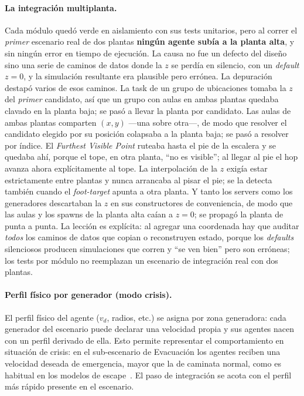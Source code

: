 \documentclass[11pt,a4paper]{article}
\begin{document}
\paragraph{La integración multiplanta.}
Cada módulo quedó verde en aislamiento con sus tests unitarios, pero al correr el \emph{primer}
escenario real de dos plantas \textbf{ningún agente subía a la planta alta}, y sin ningún error
en tiempo de ejecución. La causa no fue un defecto del diseño sino una serie de caminos de datos
donde la $z$ se perdía en silencio, con un \emph{default} $z=0$, y la simulación resultante era
plausible pero errónea. La depuración destapó varios de esos caminos. La task de un grupo de
ubicaciones tomaba la $z$ del \emph{primer} candidato, así que un grupo con aulas en ambas plantas
quedaba clavado en la planta baja; se pasó a llevar la planta por candidato. Las aulas de ambas
plantas comparten $(x,y)$ ---una sobre otra---, de modo que resolver el candidato elegido por su
posición colapsaba a la planta baja; se pasó a resolver por índice. El \emph{Furthest Visible
Point} ruteaba hasta el pie de la escalera y se quedaba ahí, porque el tope, en otra planta, ``no
es visible''; al llegar al pie el hop avanza ahora explícitamente al tope. La interpolación de la
$z$ exigía estar estrictamente entre plantas y nunca arrancaba al pisar el pie; se la detecta
también cuando el \emph{foot-target} apunta a otra planta. Y tanto los servers como los generadores
descartaban la $z$ en sus constructores de conveniencia, de modo que las aulas y los spawns de la
planta alta caían a $z=0$; se propagó la planta de punta a punta. La lección es explícita: al
agregar una coordenada hay que auditar \emph{todos} los caminos de datos que copian o reconstruyen
estado, porque los \emph{defaults} silenciosos producen simulaciones que corren y ``se ven bien''
pero son erróneas; los tests por módulo no reemplazan un escenario de integración real con dos
plantas.

\paragraph{Perfil físico por generador (modo crisis).}
El perfil físico del agente ($v_d$, radios, etc.) se asigna por zona generadora: cada generador
del escenario puede declarar una velocidad propia y sus agentes nacen con un perfil derivado de
ella. Esto permite representar el comportamiento en situación de crisis: en el sub-escenario de
Evacuación los agentes reciben una velocidad deseada de emergencia, mayor que la de caminata
normal, como es habitual en los modelos de escape~\cite{helbing2000}. El paso de integración se
acota con el perfil más rápido presente en el escenario.
\end{document}
